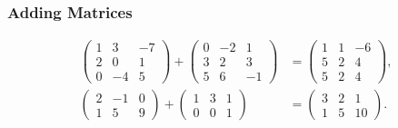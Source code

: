 \begin{frame}
  \frametitle{Adding Matrices}
  \begin{presentation_example}
    \begin{align*}
      \begin{pmatrix}
        1 & 3 & -7\\
        2 & 0 & 1\\
        0 & -4 & 5
      \end{pmatrix} +
      \begin{pmatrix}
        0 & -2 & 1\\
        3 & 2 & 3\\
        5 & 6 & -1
      \end{pmatrix} &=
      \begin{pmatrix}
        1 & 1 & -6\\
        5 & 2 & 4\\
        5 & 2 & 4
      \end{pmatrix},\\[5mm]
      \begin{pmatrix}
        2 & -1 & 0\\
        1 & 5 & 9
      \end{pmatrix} +
      \begin{pmatrix}
        1 & 3 & 1\\
        0 & 0 & 1
      \end{pmatrix} &=
      \begin{pmatrix}
        3 & 2 & 1\\
        1 & 5 & 10
      \end{pmatrix}.
    \end{align*}
  \end{presentation_example}
\end{frame}

